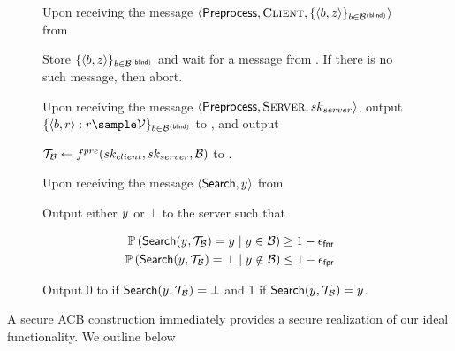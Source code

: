 \begin{figure}
\begin{mdframed}
\enumListEnd
\item Upon receiving the message $\langle \preprocess, \client, \{\langle \genericBlocklistElmt, \genericCInputElmtPRFEval \rangle\}_{\genericBlocklistElmt \in \blindedBlocklist} \rangle$ from \client
\enumListStart
\item Store $\{\langle \genericBlocklistElmt, \genericCInputElmtPRFEval \rangle\}_{\genericBlocklistElmt \in \blindedBlocklist}$ and wait for a \preprocess message from \server. If there is no such message, then abort. 
\item Upon receiving the message $\langle \mathsf{Preprocess}, \textsc{Server}, sk_{server} \rangle$, output 
$\{\langle \genericBlocklistElmt, \genericRand \rangle: \genericRand \sample \preprocessOutputSpace\}_{\genericBlocklistElmt \in \blindedBlocklist}$ to \server, and output $ $
 
$\blklistToken \assign \preprocessFn(\clientSecretKey, \serverSecretKey, \blocklist)$ to \client. 
\enumListEnd
\item Upon receiving the message $\langle \searchBlocklist, \genericCInputElmt \rangle$ from \client

\enumListStart
\item Output either $\genericCInputElmt$  or $\bot$ to the server such that  


\begin{align}
\cprob{}{\searchBlocklist(\genericCInputElmt, \blklistToken) = \genericCInputElmt}{\genericCInputElmt \in \blocklist} \ge 1 - \fnr\\
\cprob{}{\searchBlocklist(\genericCInputElmt, \blklistToken) = \bot}{\genericCInputElmt \notin \blocklist} \le 1 - \fpr 
\end{align}

\item Output $0$ to \client if $\searchBlocklist(\genericCInputElmt, \blklistToken) = \bot$ and 1 if $\searchBlocklist(\genericCInputElmt, \blklistToken) = \genericCInputElmt$. 

\enumListEnd
\itemListEnd
\end{mdframed}
\end{figure}

\fi 




%
A secure ACB construction immediately provides a secure realization of our ideal functionality. We outline below

